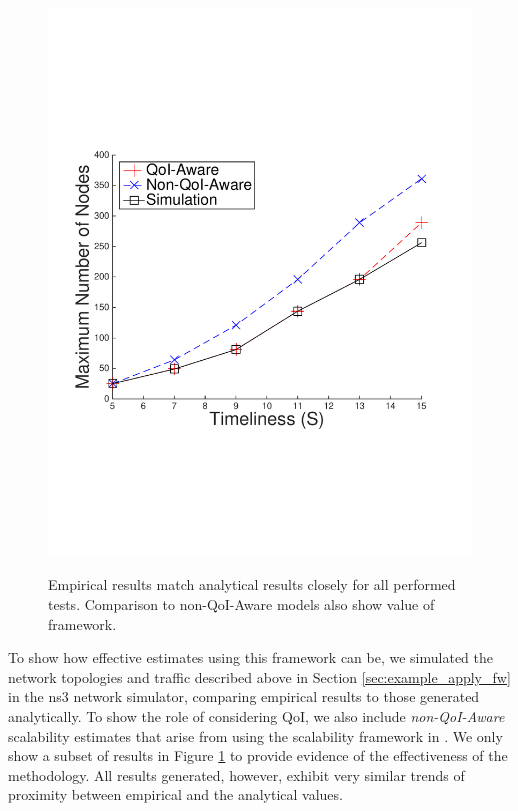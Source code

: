 \begin{figure}[]
{        \includegraphics[scale=0.20, clip=true, trim=15mm 65mm 20mm 65mm]{figures/scal_sim_results/color_2d/grid_uni_2d_qoi_vs_non_color_3.pdf}
        \label{fig:scal_vs_qoi_grid}
        }
   \caption{Empirical results match analytical results closely for all performed tests.  Comparison to non-QoI-Aware models also show value of framework.}
   \label{fig:scal_vs_qoi}
\end{figure}

To show how effective estimates using this framework can be, we simulated the network topologies and traffic described above in Section \ref{sec:example_apply_fw} in the ns3 network simulator, comparing empirical results to those generated analytically.  To show the role of considering QoI, we also include \emph{non-QoI-Aware} scalability estimates that arise from using the scalability framework in \cite{symptotics_framework_scalability}.  We only show a subset of results in Figure \ref{fig:scal_vs_qoi} to provide evidence of the effectiveness of the methodology.  All results generated, however, exhibit very similar trends of proximity between empirical and the analytical values.

